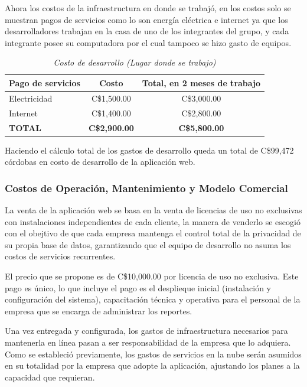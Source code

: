 \newpage

Ahora los costos de la infraestructura en donde se trabajó, en los costos solo se muestran pagos de servicios como lo son energía eléctrica e internet ya que los desarrolladores trabajan en la casa de uno de los integrantes del grupo, y cada integrante posee su computadora por el cual tampoco se hizo gasto de equipos.

\begin{table}[htbp]
	\centering
	\caption{\emph{Costo de desarrollo (Lugar donde se trabajo)}}
	\label{tab:costo_lugar}
	\begin{tabularx}{\textwidth}{X c c}
		\toprule
		\textbf{Pago de servicios} & \textbf{Costo} & \textbf{Total, en 2 meses de trabajo} \\
		\midrule
		Electricidad & C\$1,500.00 & C\$3,000.00 \\
		Internet & C\$1,400.00 & C\$2,800.00 \\
		\midrule
		\textbf{TOTAL} & \textbf{C\$2,900.00} & \textbf{C\$5,800.00} \\
		\bottomrule
	\end{tabularx}
\end{table}
\newpage
Haciendo el cálculo total de los gastos de desarrollo queda un total de C\$99,472 córdobas en costo de desarrollo de la aplicación web.

\subsubsection{Costos de Operación, Mantenimiento y Modelo Comercial}
La venta de la aplicación web se basa en la venta de licencias de uso no exclusivas con instalaciones independientes de cada cliente, la manera de venderlo se escogió con el obejtivo de que cada empresa mantenga el control total de la privacidad de su propia base de datos, garantizando que el equipo de desarrollo no asuma los costos de servicios recurrentes.

El precio que se propone es de C\$10,000.00 por licencia de uso no exclusiva. Este pago es único, lo que incluye el pago es el desplieque inicial (instalación y configuración del sistema), capacitación técnica y operativa para el personal de la empresa que se encarga de administrar los reportes.

Una vez entregada y configurada, los gastos de infraestructura necesarios para mantenerla en línea pasan a ser responsabilidad de la empresa que lo adquiera. Como se estableció previamente, los gastos de servicios en la nube serán asumidos en su totalidad por la empresa que adopte la aplicación, ajustando los planes a la capacidad que requieran.

